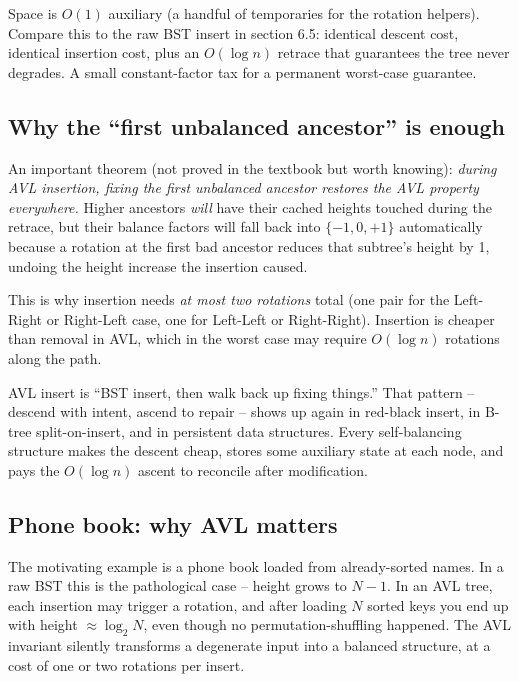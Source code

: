 \documentclass[11pt]{article}
\begin{document}
Space is $O(1)$ auxiliary (a handful of temporaries for the rotation helpers). Compare this to the raw BST insert in section 6.5: identical descent cost, identical insertion cost, plus an $O(\log n)$ retrace that guarantees the tree never degrades. A small constant-factor tax for a permanent worst-case guarantee.

\subsection*{Why the ``first unbalanced ancestor'' is enough}

An important theorem (not proved in the textbook but worth knowing): \emph{during AVL insertion, fixing the first unbalanced ancestor restores the AVL property everywhere.} Higher ancestors \emph{will} have their cached heights touched during the retrace, but their balance factors will fall back into $\{-1, 0, +1\}$ automatically because a rotation at the first bad ancestor reduces that subtree's height by 1, undoing the height increase the insertion caused.

This is why insertion needs \emph{at most two rotations} total (one pair for the Left-Right or Right-Left case, one for Left-Left or Right-Right). Insertion is cheaper than removal in AVL, which in the worst case may require $O(\log n)$ rotations along the path.

\begin{ideabox}
AVL insert is ``BST insert, then walk back up fixing things.'' That pattern -- descend with intent, ascend to repair -- shows up again in red-black insert, in B-tree split-on-insert, and in persistent data structures. Every self-balancing structure makes the descent cheap, stores some auxiliary state at each node, and pays the $O(\log n)$ ascent to reconcile after modification.
\end{ideabox}

\subsection*{Phone book: why AVL matters}

The motivating example is a phone book loaded from already-sorted names. In a raw BST this is the pathological case -- height grows to $N - 1$. In an AVL tree, each insertion may trigger a rotation, and after loading $N$ sorted keys you end up with height $\approx \log_2 N$, even though no permutation-shuffling happened. The AVL invariant silently transforms a degenerate input into a balanced structure, at a cost of one or two rotations per insert.
\end{document}
